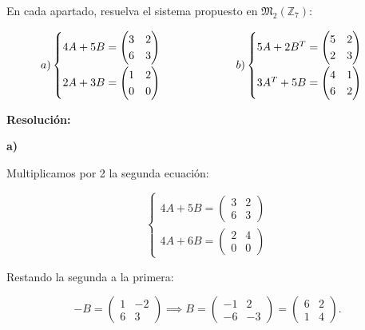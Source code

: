 \documentclass[a4paper,12pt]{article}
\begin{document}
\begin{ejercicio}[title=Ejercicio 5]
En cada apartado, resuelva el sistema propuesto en $\mathfrak{M}_2(\mathbb{Z}_7)$:

\[
\begin{tabular}{c @{\hspace{2cm}} c}
$a)\begin{cases}
4A + 5B =
\begin{pmatrix}
3 & 2\\
6 & 3
\end{pmatrix}\\[1em]
2A + 3B =
\begin{pmatrix}
1 & 2\\
0 & 0
\end{pmatrix}
\end{cases}$ &
$b)\begin{cases}
5A + 2B^T =
\begin{pmatrix}
5 & 2\\
2 & 3
\end{pmatrix}\\[1em]
3A^T + 5B =
\begin{pmatrix}
4 & 1\\
6 & 2
\end{pmatrix}
\end{cases}$
\end{tabular}
\]

\tcblower
\textbf{Resolución:}

\textbf{a)}

\vspace{0.5em}

Multiplicamos por 2 la segunda ecuación:

\[
\begin{cases}
    4A + 5B = 
    \begin{pmatrix}
        3 & 2 \\
        6 & 3
    \end{pmatrix} \\
    4A + 6B = 
    \begin{pmatrix}
        2 & 4 \\
        0 & 0
    \end{pmatrix}
\end{cases}
\]

Restando la segunda a la primera:

\[
-B = 
\begin{pmatrix}
1 & -2\\
6 & 3
\end{pmatrix}
\implies B = 
\begin{pmatrix}
-1 & 2\\
-6 & -3
\end{pmatrix}
=
\begin{pmatrix}
6 & 2\\
1 & 4
\end{pmatrix}.
\]


\end{ejercicio}
\end{document}
